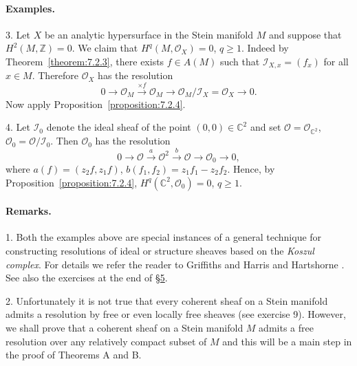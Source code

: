 \paragraph{Examples.}
3. Let $X$ be an analytic hypersurface in the Stein manifold $M$ and suppose that $H^2(M,\mathbb{Z})=0$. We claim that $H^q(M,\mathcal{O}_X)=0$, $q\geq1$. Indeed by Theorem~\ref{theorem:7.2.3}, there exists $f\in A(M)$ such that $\mathcal{I}_{X,x}=(f_x)$ for all $x\in M$. Therefore $\mathcal{O}_X$ has the resolution
\[
0\to\mathcal{O}_M\xrightarrow{\times f}\mathcal{O}_M\to\mathcal{O}_M/\mathcal{I}_X=\mathcal{O}_X\to0.
\]
Now apply Proposition~\ref{proposition:7.2.4}.

4. Let $\mathcal{I}_0$ denote the ideal sheaf of the point $(0,0)\in\mathbb{C}^2$ and set $\mathcal{O}=\mathcal{O}_{\mathbb{C}^2}$, $\mathcal{O}_0=\mathcal{O}/\mathcal{I}_0$. Then $\mathcal{O}_0$ has the resolution
\[
0\to\mathcal{O}\xrightarrow{a}\mathcal{O}^2\xrightarrow{b}\mathcal{O}\to\mathcal{O}_0\to0,
\]
where $a(f)=(z_2f,z_1f)$, $b(f_1,f_2)=z_1f_1-z_2f_2$. Hence, by Proposition~\ref{proposition:7.2.4}, $H^q(\mathbb{C}^2,\mathcal{O}_0)=0$, $q\geq1$.
\paragraph{Remarks.}
1. Both the examples above are special instances of a general technique for constructing resolutions of ideal or structure sheaves based on the \emph{Koszul complex}. For details we refer the reader to Griffiths and Harris \cite{bib:II:griffiths-p-and-harris-j:1} and Hartshorne \cite{bib:II:hartshorne-r:1}. See also the exercises at the end of \hyperref[sec:7:5]{\S5}.

2. Unfortunately it is not true that every coherent sheaf on a Stein manifold admits a resolution by free or even locally free sheaves (see exercise 9). However, we shall prove that a coherent sheaf on a Stein manifold $M$ admits a free resolution over any relatively compact subset of $M$ and this will be a main step in the proof of Theorems A and B.

